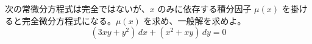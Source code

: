 
次の常微分方程式は完全ではないが、$x$ のみに依存する積分因子 $\mu(x)$ を掛けると完全微分方程式になる。$\mu(x)$ を求め、一般解を求めよ。
\[
(3xy + y^{2})\,dx + (x^{2} + xy)\,dy = 0
\]
